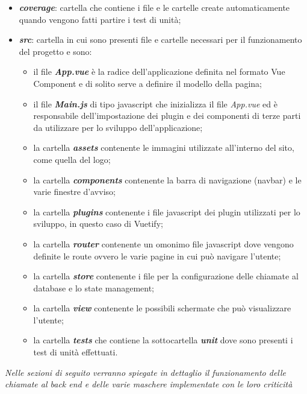 \begin{itemize}
	\item \textbf{\textit{coverage}}: cartella che contiene i file e le cartelle create automaticamente quando vengono fatti partire i test di unità;
	\item \textbf{\textit{src}}: cartella in cui sono presenti file e cartelle necessari per il funzionamento del progetto e sono:
	\begin{itemize}
		\item il file \textbf{\textit{App.vue}} è la radice dell'applicazione definita nel formato Vue Component e di solito serve a definire il modello della pagina;
		\item il file \textbf{\textit{Main.js}} di tipo javascript che inizializza il file \textit{App.vue} ed è responsabile dell'impostazione dei plugin e dei componenti di terze parti da utilizzare per lo sviluppo dell'applicazione;
		\item la cartella \textbf{\textit{assets}} contenente le immagini utilizzate all'interno del sito, come quella del logo;
		\item la cartella \textbf{\textit{components}} contenente la barra di navigazione (navbar) e le varie finestre d'avviso;
		\item la cartella \textbf{\textit{plugins}} contenente i file javascript dei plugin utilizzati per lo sviluppo, in questo caso di Vuetify;
		\item la cartella \textbf{\textit{router}} contenente un omonimo file javascript dove vengono definite le route ovvero le varie pagine in cui può navigare l'utente;
		\item la cartella \textbf{\textit{store}} contenente i file per la configurazione delle chiamate al database e lo state management;
		\item la cartella \textbf{\textit{view}} contenente le possibili schermate che può visualizzare l'utente;
		\item la cartella \textbf{\textit{tests}} che contiene la sottocartella \textbf{\textit{unit}} dove sono presenti i test di unità effettuati.
	\end{itemize}
\end{itemize}

\textit{Nelle sezioni di seguito verranno spiegate in dettaglio il funzionamento delle chiamate al back end e delle varie maschere implementate con le loro criticità}

